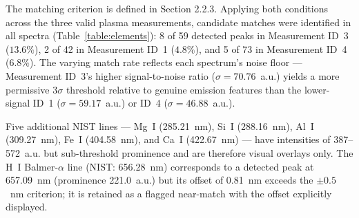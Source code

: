 \documentclass[final,5p,twocolumn,a4paper]{elsarticle}
\begin{document}
The matching criterion is defined in Section 2.2.3. Applying both conditions across the three valid plasma measurements, candidate matches were identified in all spectra (Table~\ref{table:elements}): 8 of 59 detected peaks in Measurement ID~3 ($13.6\%$), 2 of 42 in Measurement ID~1 ($4.8\%$), and 5 of 73 in Measurement ID~4 ($6.8\%$). The varying match rate reflects each spectrum's noise floor --- Measurement ID~3's higher signal-to-noise ratio ($\sigma = 70.76$~a.u.) yields a more permissive $3\sigma$ threshold relative to genuine emission features than the lower-signal ID~1 ($\sigma = 59.17$~a.u.) or ID~4 ($\sigma = 46.88$~a.u.).

Five additional NIST lines --- Mg~I (285.21~nm), Si~I (288.16~nm), Al~I (309.27~nm), Fe~I (404.58~nm), and Ca~I (422.67~nm) --- have intensities of 387--572~a.u. but sub-threshold prominence and are therefore visual overlays only. The H~I Balmer-$\alpha$ line (NIST: 656.28~nm) corresponds to a detected peak at 657.09~nm (prominence 221.0~a.u.) but its offset of 0.81~nm exceeds the $\pm0.5$~nm criterion; it is retained as a flagged near-match with the offset explicitly displayed.
\end{document}
